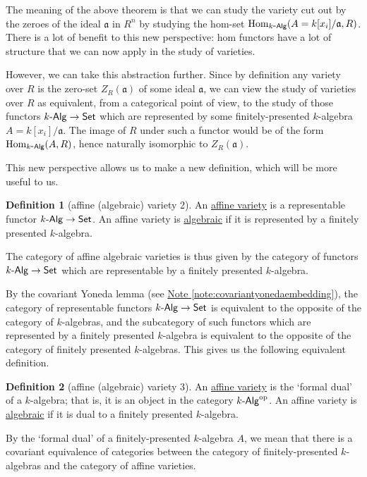 \documentclass[a4paper,10pt]{scrreprt}
\newcommand{\defn}[1]{\ul{#1}}
\newcommand{\Hom}{\mathrm{Hom}}
\def\mhyp{{\hbox{-}}}
\theoremstyle{definition}
\newtheorem{definition}{Definition}[section]
\theoremstyle{plain}
\theoremstyle{remark}
\begin{document}
The meaning of the above theorem is that we can study the variety cut out by the zeroes of the ideal $\mathfrak{a}$ in $R^{n}$ by studying the hom-set $\Hom_{k\mhyp\mathsf{Alg}}(A = k[x_{i}]/\mathfrak{a}, R)$. There is a lot of benefit to this new perspective: hom functors have a lot of structure that we can now apply in the study of varieties.

However, we can take this abstraction further. Since by definition any variety over $R$ is the zero-set $Z_{R}(\mathfrak{a})$ of some ideal $\mathfrak{a}$, we can view the study of varieties over $R$ as equivalent, from a categorical point of view, to the study of those functors $k\mhyp\mathsf{Alg} \to \mathsf{Set}$ which are represented by some finitely-presented $k$-algebra $A = k[x_{i}]/\mathfrak{a}$. The image of $R$ under such a functor would be of the form $\Hom_{k\mhyp\mathsf{Alg}}(A, R)$, hence naturally isomorphic to $Z_{R}(\mathfrak{a})$.

This new perspective allows us to make a new definition, which will be more useful to us.

\begin{definition}[affine (algebraic) variety 2]
  \label{def:affinealgebraicvariety2}
  An \defn{affine variety} is a representable functor $k\mhyp\mathsf{Alg} \to \mathsf{Set}$. An affine variety is \defn{algebraic} if it is represented by a finitely presented $k$-algebra.

  The category of affine algebraic varieties is thus given by the category of functors $k\mhyp\mathsf{Alg} \to \mathsf{Set}$ which are representable by a finitely presented $k$-algebra.
\end{definition}

By the covariant Yoneda lemma (see \hyperref[note:covariantyonedaembedding]{Note \ref*{note:covariantyonedaembedding}}), the category of representable functors $k\mhyp\mathsf{Alg} \to \mathsf{Set}$ is equivalent to the opposite of the category of $k$-algebras, and the subcategory of such functors which are represented by a finitely presented $k$-algebra is equivalent to the opposite of the category of finitely presented $k$-algebras. This gives us the following equivalent definition.

\begin{definition}[affine (algebraic) variety 3]
  \label{def:affinealgebraicvariety3}
  An \defn{affine variety} is the `formal dual' of a $k$-algebra; that is, it is an object in the category $k\mhyp\mathsf{Alg}^{\mathrm{op}}$. An affine variety is \defn{algebraic} if it is dual to a finitely presented $k$-algebra.

  By the `formal dual' of a finitely-presented $k$-algebra $A$, we mean that there is a covariant equivalence of categories between the category of finitely-presented $k$-algebras and the category of affine varieties.

\end{definition}
\end{document}

